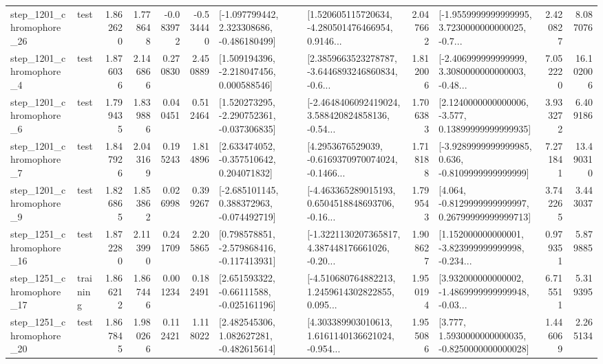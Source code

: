 \begin{tabular}{llrrrrllrlrr}
 step\_1201\_chromophore\_26 &      test &      1.862620 &    1.778648 &     -0.083972 & -0.534440 &   [-1.097799442, 2.323308686, -0.486180499] &  [1.520605115720634, -4.280501476466954, 0.9146... &       2.047662 &  [-1.9559999999999995, 3.7230000000000025, -0.7... &            2.420827 &          8.087076 \\
  step\_1201\_chromophore\_4 &      test &      1.876036 &    2.146866 &      0.270830 &  2.450889 &    [1.509194396, -2.218047456, 0.000588546] &  [2.3859663523278787, -3.6446893246860834, -0.6... &       1.812006 &  [-2.406999999999999, 3.3080000000000003, -0.48... &            7.052220 &         16.102006 \\
  step\_1201\_chromophore\_6 &      test &      1.799435 &    1.839886 &      0.040451 &  0.512464 &   [1.520273295, -2.290752361, -0.037306835] &  [-2.4648406092419024, 3.588420824858136, -0.54... &       1.706383 &  [2.1240000000000006, -3.577, 0.13899999999999935] &            3.933272 &          6.409186 \\
  step\_1201\_chromophore\_7 &      test &      1.847926 &    2.043169 &      0.195243 &  1.814896 &    [2.633474052, -0.357510642, 0.204071832] &  [4.2953676529039, -0.6169370970074024, -0.1466... &       1.718188 &  [-3.9289999999999985, 0.636, -0.8109999999999999] &            7.271841 &         13.490310 \\
  step\_1201\_chromophore\_9 &      test &      1.826865 &    1.853862 &      0.026998 &  0.399267 &   [-2.685101145, 0.388372963, -0.074492719] &  [-4.463365289015193, 0.6504518848693706, -0.16... &       1.799543 &  [4.064, -0.8129999999999997, 0.26799999999999713] &            3.742265 &          3.443037 \\
 step\_1251\_chromophore\_16 &      test &      1.872280 &    2.113990 &      0.241709 &  2.205865 &   [0.798578851, -2.579868416, -0.117413931] &  [-1.3221130207365817, 4.387448176661026, -0.20... &       1.908627 &  [1.152000000000001, -3.823999999999998, -0.234... &            0.979351 &          5.879885 \\
 step\_1251\_chromophore\_17 &  training &      1.866212 &    1.867446 &      0.001234 &  0.182491 &    [2.651593322, -0.66111588, -0.025161196] &  [-4.510680764882213, 1.2459614302822855, 0.095... &       1.950194 &  [3.932000000000002, -1.4869999999999948, -0.03... &            6.715511 &          5.319395 \\
 step\_1251\_chromophore\_20 &      test &      1.867845 &    1.980266 &      0.112421 &  1.118022 &    [2.482545306, 1.082627281, -0.482615614] &  [4.303389903010613, 1.6161140136621024, -0.954... &       1.955086 &   [3.777, 1.5930000000000035, -0.8250000000000028] &            1.446069 &          2.265134 \\

\end{tabular}

